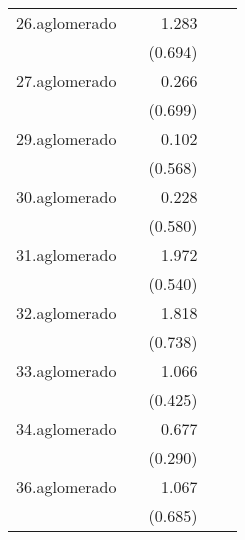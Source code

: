 {\begin{longtable}{l*{4}{D{.}{.}{-1}}}
\addlinespace
26.aglomerado&                     &       1.283         &                     &                     \\
            &                     &     (0.694)         &                     &                     \\
\addlinespace
27.aglomerado&                     &       0.266         &                     &                     \\
            &                     &     (0.699)         &                     &                     \\
\addlinespace
29.aglomerado&                     &       0.102         &                     &                     \\
            &                     &     (0.568)         &                     &                     \\
\addlinespace
30.aglomerado&                     &       0.228         &                     &                     \\
            &                     &     (0.580)         &                     &                     \\
\addlinespace
31.aglomerado&                     &       1.972\sym{***}&                     &                     \\
            &                     &     (0.540)         &                     &                     \\
\addlinespace
32.aglomerado&                     &       1.818\sym{*}  &                     &                     \\
            &                     &     (0.738)         &                     &                     \\
\addlinespace
33.aglomerado&                     &       1.066\sym{*}  &                     &                     \\
            &                     &     (0.425)         &                     &                     \\
\addlinespace
34.aglomerado&                     &       0.677\sym{*}  &                     &                     \\
            &                     &     (0.290)         &                     &                     \\
\addlinespace
36.aglomerado&                     &       1.067         &                     &                     \\
            &                     &     (0.685)         &                     &                     \\

\end{longtable}}

